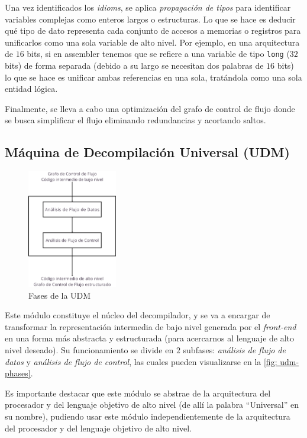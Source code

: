 \documentclass[runningheads]{llncs}
\begin{document}
Una vez identificados los \textit{idioms}, se aplica \textit{propagación de tipos} para identificar 
variables complejas como enteros largos o estructuras. Lo que se hace es deducir qué tipo de dato 
representa cada conjunto de accesos a memorias o registros para unificarlos como una sola variable 
de alto nivel. Por ejemplo, en una arquitectura de $16$ bits, si en assembler tenemos que se refiere 
a una variable de tipo \verb|long| ($32$ bits) de forma separada (debido a su largo se necesitan dos 
palabras de $16$ bits) lo que se hace es unificar ambas referencias en una sola, tratándola como 
una sola entidad lógica.

Finalmente, se lleva a cabo una optimización del grafo de control de flujo donde se busca 
simplificar el flujo eliminando redundancias y acortando saltos.

\subsection{Máquina de Decompilación Universal (UDM)}
\begin{figure}
  \vspace{-15pt}
  \centering
  \includegraphics[width=0.35\textwidth]{udm-phases.png}
  \caption{Fases de la UDM}
  \label{fig: udm-phases}
  \vspace{-20pt}
\end{figure}

Este módulo constituye el núcleo del decompilador, y se va a encargar de transformar la
representación intermedia de bajo nivel generada por el \textit{front-end} en una forma más abstracta
y estructurada (para acercarnos al lenguaje de alto nivel deseado). Su funcionamiento se divide en
$2$ subfases: \textit{análisis de flujo de datos} y \textit{análisis de flujo de control}, las cuales 
pueden visualizarse en la \autoref{fig: udm-phases}.

Es importante destacar que este módulo se abstrae de la arquitectura del procesador y del lenguaje 
objetivo de alto nivel (de allí la palabra “Universal” en su nombre), pudiendo usar este módulo
independientemente de la arquitectura del procesador y del lenguaje objetivo de alto nivel.
\end{document}
